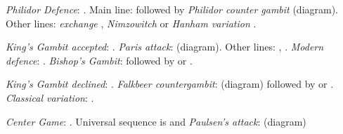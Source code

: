 \hspace{5mm}
\begin{minipage}[t]{.175\linewidth}
\raggedright
\begin{center}
\scalebox{.560}{\showboard}
\end{center}
\newgame
\emph{Philidor Defence}: .
Main line:  followed by \emph{Philidor counter gambit}  (diagram).
Other lines: \emph{exchange} , \emph{Nimzowitch}  or \emph{Hanham variation} .
\vspace{2mm}
\end{minipage}
\hspace{5mm}
\begin{minipage}[t]{.175\linewidth}
\raggedright
\begin{center}
\scalebox{.560}{\showboard}
\end{center}
\newgame
\emph{King's Gambit accepted}: .
\emph{Paris attack}:  (diagram).
Other lines: , .
\emph{Modern defence}: .
\emph{Bishop's Gambit}:  followed by  or .
\vspace{2mm}
\end{minipage}
\newline
\begin{minipage}[t]{.175\linewidth}
\raggedright
\begin{center}
\scalebox{.560}{\showboard}
\end{center}
\newgame
\emph{King's Gambit declined}: .
\emph{Falkbeer countergambit}:  (diagram) followed by  or .
\emph{Classical variation}: .
\vspace{2mm}
\end{minipage}
\hspace{5mm}
\begin{minipage}[t]{.175\linewidth}
\raggedright
\begin{center}
\scalebox{.560}{\showboard}
\end{center}
\newgame
\emph{Center Game}: .
Universal sequence is  and \emph{Paulsen's attack}:  (diagram)
\vspace{2mm}
\end{minipage}
